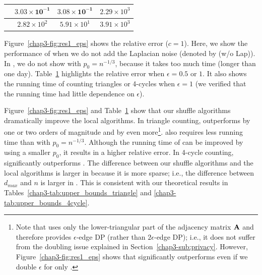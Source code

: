 \begin{table}[t]
\begin{tabular}{|c|c|c|c|}
    \AlgWSCyc{} & $\bm{3.03 \times 10^{-1}}$ & $\bm{3.08 \times 10^{-1}}$ & $2.29 \times 10^3$ \\ \hline
    \AlgWLCyc{} & $2.82 \times 10^2$ & $5.91 \times 10^1$ & $3.91 \times 10^3$ \\ \hline
  \end{tabular}
  \label{chap3-tab:res1_eps_tri_time}
\end{table}

Figure~\ref{chap3-fig:res1_eps} shows the relative error ($c=1$). 
Here, we show the performance of \AlgWSTri{} when we do not add the Laplacian noise (denoted by \AlgWSTri{} (w/o Lap)). 
In \IMDB{}, we do not show \AlgARRTri{} with $p_0 = n^{-1/3}$, because it takes too much time (longer than one day). 
Table~\ref{chap3-tab:res1_eps_tri_time} highlights the relative error when $\epsilon=0.5$ or $1$. 
It also shows the running time of counting triangles or 4-cycles when $\epsilon=1$ (we verified that the running time had little dependence on $\epsilon$). 

Figure~\ref{chap3-fig:res1_eps} and Table~\ref{chap3-tab:res1_eps_tri_time} show that our shuffle algorithms dramatically improve the local algorithms. 
In triangle counting, 
\AlgWSTriVR{} outperforms \AlgWLTri{} by one or two orders of magnitude and \AlgARRTri{} by even more\footnote{Note that \AlgARRTri{} uses only the lower-triangular part of the adjacency matrix $\mathbf{A}$ and therefore provides 
$\epsilon$-edge DP (rather than $2\epsilon$-edge DP); i.e., it does not suffer from the doubling issue explained in Section~\ref{chap3-sub:privacy}. However, Figure~\ref{chap3-fig:res1_eps} shows that \AlgWSTriVR{} significantly outperforms \AlgARRTri{} 
even if we double $\epsilon$ for only \AlgWSTriVR{}.}. 
\AlgWSTriVR{} also requires less running time than \AlgARRTri{} with $p_0 = n^{-1/3}$. 
Although the running time of \AlgARRTri{} can be improved by using a smaller $p_0$, it results in a higher relative error. 
In 4-cycle counting, 
\AlgWSCyc{} significantly outperforms \AlgWLCyc{}. 
The difference between our shuffle algorithms and the local algorithms is larger in \IMDB{} because it is more sparse; i.e., the difference between $d_{max}$ and $n$ is larger in \IMDB{}. 
This is consistent with our theoretical results in Tables~\ref{chap3-tab:upper_bounds_triangle} and \ref{chap3-tab:upper_bounds_4cycle}. 

